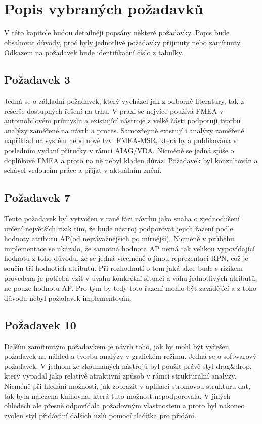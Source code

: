 \section{Popis vybraných požadavků}
V této kapitole budou detailněji popsány některé požadavky. Popis bude obsahovat důvody, proč byly jednotlivé požadavky přijmuty nebo zamítnuty. Odkazem na požadavek bude identifikační číslo z tabulky. 

\subsection{Požadavek 3}
Jedná se o základní požadavek, který vycházel jak z odborné literatury, tak z rešerše dostupných řešení na trhu. V praxi se nejvíce používá FMEA v automobilovém průmyslu a existující nástroje z velké části podporují tvorbu analýzy zaměřené na návrh a proces. Samozřejmě existují i analýzy zaměřené například na systém nebo nově tzv. FMEA-MSR, která byla publikována v posledním vydaní příručky v rámci AIAG/VDA. \cite{msr} Nicméně se jedná spíše o doplňkové FMEA a proto na ně nebyl kladen důraz. Požadavek byl konzultován a schável vedoucím práce a přijat v aktuálním znění.  

\subsection{Požadavek 7}
Tento požadavek byl vytvořen v rané fázi návrhu jako snaha o zjednodušení určení největších rizik tím, že bude nástroj podporovat jejich řazení podle hodnoty atributu AP(od nejzávažnějších po mírnější). Nicméně v průběhu implementace se ukázalo, že samotná hodnota AP nemá tak velikou vypovídající hodnotu z toho důvodu, že se jedná víceméně o jinou reprezentaci RPN, což je součin tří hodnotích atributů. Při rozhodnutí o tom jaká akce bude s rizikem provedena je potřeba vzít v úvahu konkrétní situaci a váhu jednotlivých atributů, ne pouze hodnotu AP. Pro tým by tedy toto řazení mohlo být zavádějící a z toho důvodu nebyl požadavek implementován.   

\subsection{Požadavek 10}
\label{subsec:pozadavek_10}
Dalším zamítnutým požadavkem je návrh toho, jak by mohl být vyřešen požadavek na náhled a tvorbu analýzy v grafickém režimu. Jedná se o softwarový požadavek. V jednom ze zkoumaných nástrojů byl použit právě styl drag\&drop, který vypadal jako relativě atraktivní způsob v rámci strukturální analýzy. Nicméně při hledání možnosti, jak zobrazit v aplikaci stromovou strukturu dat, tak byla nalezena knihovna, která tuto možnost nepodporovala. V jiných ohledech ale přesně odpovídala požadovným vlastnostem a proto byl nakonec zvolen styl přidávání dalších uzlů pomocí tlačítka pro přidání. 

